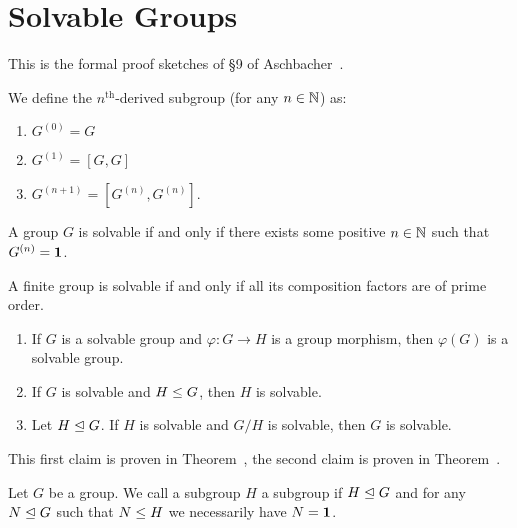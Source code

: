 \section{Solvable Groups}

This is the formal proof sketches of \S9 of Aschbacher~\cite{aschbacher2000finite}.

\begin{definition}
We define the $n^{\text{th}}$-derived subgroup (for any $n\in\mathbb{N}$) as:
\begin{enumerate}
\item $G^{(0)} = G$
\item $G^{(1)} = [G, G]$ 
\item $G^{(n+1)} = [G^{(n)}, G^{(n)}]$.
\end{enumerate}
\end{definition}

\begin{theorem}
A group $G$ is solvable if and only if there exists some positive
$n\in\mathbb{N}$ such that $G^{(n)}=\mathbf{1}$.
\end{theorem}

\begin{theorem}
A finite group is solvable if and only if all its composition factors
are of prime order.
\end{theorem}

\begin{theorem}
  \begin{enumerate}
  \item If $G$ is a solvable group and $\varphi\colon G\to H$ is a group
morphism, then $\varphi(G)$ is a solvable group.
\item If $G$ is solvable and $H\leq G$, then $H$ is solvable.
\item Let $H\trianglelefteq G$. If $H$ is solvable and $G/H$ is
  solvable, then $G$ is solvable.
  \end{enumerate}
\end{theorem}

\begin{thm-remark}
This first claim is proven in Theorem~,
the second claim is proven in Theorem~.
\end{thm-remark}

\begin{definition}
Let $G$ be a group. We call a subgroup $H$ a 
subgroup if $H\trianglelefteq G$ and for any $N\trianglelefteq G$
such that $N\leq H$ we necessarily have $N=\mathbf{1}$.
\end{definition}

